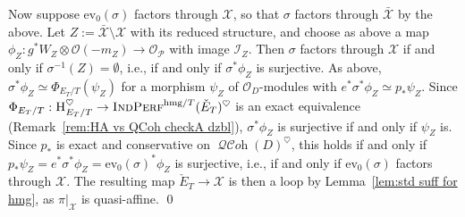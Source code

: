 \documentclass[12pt, oneside]{amsart}
\numberwithin{equation}{section}
\theoremstyle{remark}
\theoremstyle{plain}
\DeclareMathOperator{\QCOH}{\mathcal{QC}\textit{oh}}
\DeclareMathOperator{\IndPerf}{\textsc{IndPerf}}
\newcommand{\Hcat}{\textup{\textsc{H}}}
\newcommand{\OO}{\mathcal{O}}
\newcommand{\XX}{\mathcal{X}}
\newcommand{\ev}{\mathrm{ev}}
\begin{document}
Now suppose $\ev_0(\sigma)$ factors through $\XX$, so that $\sigma$ factors through $\bar{\XX}$ by the above.
Let $Z := \bar{\XX} \setminus \XX$ with its reduced structure, and choose as above a map $\phi_Z : g^*W_Z \otimes \OO(-m_Z) \to \OO_{\mathcal{P}}$ with image $\mathcal{I}_Z$.
Then $\sigma$ factors through $\XX$ if and only if $\sigma^{-1}(Z) = \emptyset$, i.e., if and only if $\sigma^*\phi_Z$ is surjective.
As above, $\sigma^*\phi_Z \simeq \Phi_{E_T/T}(\psi_Z)$ for a morphism $\psi_Z$ of $\OO_D$-modules with $e^*\sigma^*\phi_Z \simeq p_*\psi_Z$.
Since $\Phi_{E_T/T} : \Hcat_{E_T/T}^{\heartsuit} \to \IndPerf^{\mathrm{hmg}/T}(\check{E}_T)^\heartsuit$ is an exact equivalence (Remark~\ref{rem:HA vs QCoh checkA dzbl}), $\sigma^*\phi_Z$ is surjective if and only if $\psi_Z$ is.
Since $p_*$ is exact and conservative on $\QCOH(D)^\heartsuit$, this holds if and only if $p_*\psi_Z = e^*\sigma^*\phi_Z = \ev_0(\sigma)^*\phi_Z$ is surjective, i.e., if and only if $\ev_0(\sigma)$ factors through $\XX$.
The resulting map $\check{E}_T \to \XX$ is then a loop by Lemma~\ref{lem:std suff for hmg}, as $\pi|_{\XX}$ is quasi-affine.
\qed
\end{document}
